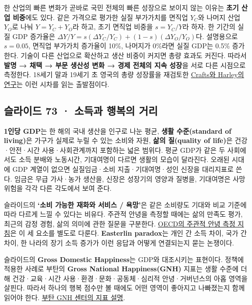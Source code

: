 \documentclass[10pt,a4paper]{article}
\begin{document}
한 산업의 빠른 변화가 곧바로 국민 전체의 빠른 성장으로 보이지 않는 이유는 \textbf{초기 산업 비중}에도 있다. 같은 가격으로 평가한 실질 부가가치를 면직업 $Y_C$와 나머지 산업 $Y_O$로 나눠 $Y=Y_C+Y_O$라 하고, 초기 면직업 비중을 $s=Y_C/Y$라 하자. 한 기간의 실질 GDP 증가율은 $\Delta Y/Y=s(\Delta Y_C/Y_C)+(1-s)(\Delta Y_O/Y_O)$다. 설명용으로 $s=0.05$, 면직업 부가가치 증가율이 10\%, 나머지가 0\%라면 실질 GDP는 0.5\% 증가한다. 기술이 다른 산업으로 확산하고 생산 비중이 커지면 총량 효과도 커진다. 따라서 \textbf{발명 → 채택 → 부문 생산성 변화 → 경제 전체의 지속 성장}을 서로 다른 시점으로 측정한다. 18세기 말과 19세기 초 영국의 총량 성장률을 재검토한 \href{https://wrap.warwick.ac.uk/id/eprint/21675/}{Crafts와 Harley의 연구}는 이런 시차를 읽는 출발점이다.\par

\subsection{슬라이드 73 · 소득과 행복의 거리}
\textbf{1인당 GDP}는 한 해의 국내 생산을 인구로 나눈 평균, \textbf{생활 수준(standard of living)}은 가구가 실제로 누릴 수 있는 소비와 자원, \textbf{삶의 질(quality of life)}은 건강·안전·시간 사용·사회관계까지 포함하는 넓은 범위다. 평균 GDP가 같은 두 사회에서도 소득 분배와 노동시간, 기대여명이 다르면 생활의 모습이 달라진다. 오래된 시대에 GDP 계열이 없으면 실질임금·소비 지출·기대여명·성인 신장을 대리지표로 쓴다. 임금은 무급 가사·농가 생산을, 신장은 성장기의 영양과 질병을, 기대여명은 사망 위험을 각각 다른 각도에서 보여 준다.\par

슬라이드의 \textbf{‘소비 가능한 재화와 서비스 / 욕망’}은 같은 소비량도 기대와 비교 기준에 따라 다르게 느낄 수 있다는 비유다. 주관적 안녕을 측정할 때에는 삶의 만족도 평가, 최근의 감정 경험, 삶의 의미에 관한 질문을 구분한다. \href{https://www.oecd.org/en/publications/oecd-guidelines-on-measuring-subjective-well-being-2025-update\_9203632a-en/full-report/measuring-subjective-well-being\_b4b53f27.html}{OECD의 주관적 안녕 측정 지침}은 이 세 요소를 별도로 다룬다. \textbf{Easterlin paradox}는 개인 간 소득 차이, 국가 간 차이, 한 나라의 장기 소득 증가가 이런 응답과 어떻게 연결되는지 묻는 논쟁이다.\par

슬라이드의 \textbf{Gross Domestic Happiness}는 GDP와 대조시키는 표현이다. 정책에 적용한 사례로 부탄의 \textbf{Gross National Happiness(GNH)} 지표는 생활 수준에 더해 건강·교육·시간 사용·환경·문화·공동체·심리적 안녕·거버넌스의 아홉 영역을 살핀다. 따라서 하나의 행복 점수만 볼 때에도 어떤 영역이 좋아지고 나빠졌는지 함께 읽어야 한다. \href{https://www.gnhcentrebhutan.org/media-sub/four-pillars-9-domains/}{부탄 GNH 센터의 지표 설명}.\par
\end{document}
